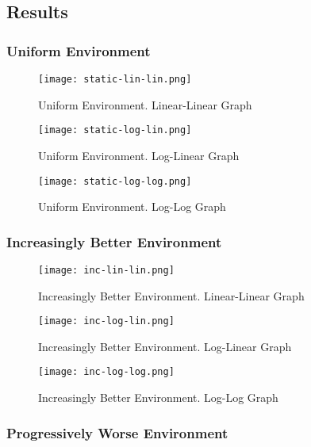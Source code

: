 \subsection{Results}

\subsubsection{Uniform Environment}
\begin{figure}[ht]
    \centering
    \texttt{[image: static-lin-lin.png]}
    \caption{Uniform Environment. Linear-Linear Graph}
    \label{fig:u1}
\end{figure}

\begin{figure}[ht]
    \centering
    \texttt{[image: static-log-lin.png]}
    \caption{Uniform Environment. Log-Linear Graph}
    \label{fig:u2}
\end{figure}

\begin{figure}[ht]
    \centering
    \texttt{[image: static-log-log.png]}
    \caption{Uniform Environment. Log-Log Graph}
    \label{fig:u3}
\end{figure}


\subsubsection{Increasingly Better Environment}

\begin{figure}[ht]
    \centering
    \texttt{[image: inc-lin-lin.png]}
    \caption{Increasingly Better Environment. Linear-Linear Graph}
    \label{fig:i1}
\end{figure}

\begin{figure}[ht]
    \centering
    \texttt{[image: inc-log-lin.png]}
    \caption{Increasingly Better Environment. Log-Linear Graph}
    \label{fig:i2}
\end{figure}

\begin{figure}[ht]
    \centering
    \texttt{[image: inc-log-log.png]}
    \caption{Increasingly Better Environment. Log-Log Graph}
    \label{fig:i3}
\end{figure}

\subsubsection{Progressively Worse Environment}

